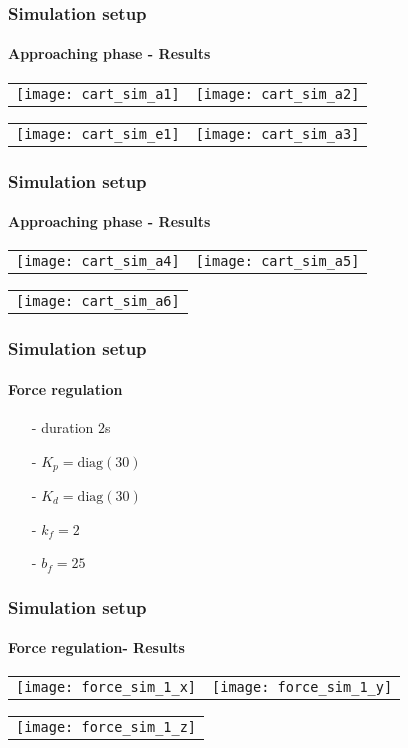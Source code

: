 \begin{frame}
  \frametitle{Simulation setup}
  \framesubtitle{Approaching phase - Results}
  \begin{center}
   \vskip-0.1in
    \begin{tabular}{cc}
      \texttt{[image: cart\_sim\_a1]} &
      \texttt{[image: cart\_sim\_a2]}
    \end{tabular}
  \end{center}
  \begin{center}
   \vskip-0.1in
    \begin{tabular}{cc}
      \texttt{[image: cart\_sim\_e1]} &
      \texttt{[image: cart\_sim\_a3]}
    \end{tabular}
  \end{center}
\end{frame}

\begin{frame}
  \frametitle{Simulation setup}
  \framesubtitle{Approaching phase - Results}
  \begin{center}
   \vskip-0.1in
    \begin{tabular}{cc}
      \texttt{[image: cart\_sim\_a4]} &
      \texttt{[image: cart\_sim\_a5]}
    \end{tabular}
  \end{center}
  \begin{center}
   \vskip-0.1in
    \begin{tabular}{c}
      \texttt{[image: cart\_sim\_a6]}
    \end{tabular}
  \end{center}
\end{frame}

\begin{frame}
  \frametitle{Simulation setup}
  \framesubtitle{Force regulation}
  \begin{itemize}
  \item[-] duration $2$s
  \item[-] $K_p = \mathrm{diag}(30)$
  \item[-] $K_d = \mathrm{diag}(30)$
  \item[-] $k_{f} = 2$
  \item[-] $b_f = 25$
  \end{itemize}
\end{frame}

\begin{frame}
  \frametitle{Simulation setup}
  \framesubtitle{Force regulation- Results}
  \begin{center}
   \vskip-0.1in
    \begin{tabular}{cc}
      \texttt{[image: force\_sim\_1\_x]} &
      \texttt{[image: force\_sim\_1\_y]}
    \end{tabular}
  \end{center}
  \begin{center}
   \vskip-0.1in
    \begin{tabular}{c}
      \texttt{[image: force\_sim\_1\_z]}
    \end{tabular}
  \end{center}
\end{frame}

